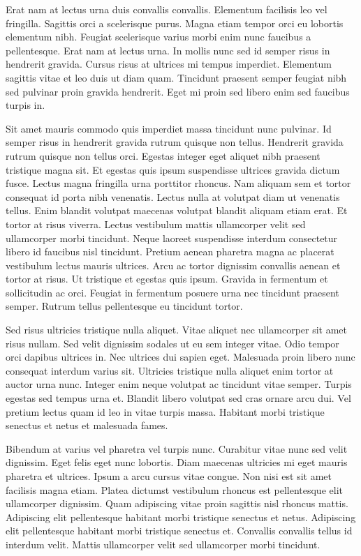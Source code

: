 \documentclass[11pt,a4paper]{article}
\begin{document}
Erat nam at lectus urna duis convallis convallis. Elementum facilisis leo vel fringilla. Sagittis orci a scelerisque purus. Magna etiam tempor orci eu lobortis elementum nibh. Feugiat scelerisque varius morbi enim nunc faucibus a pellentesque. Erat nam at lectus urna. In mollis nunc sed id semper risus in hendrerit gravida. Cursus risus at ultrices mi tempus imperdiet. Elementum sagittis vitae et leo duis ut diam quam. Tincidunt praesent semper feugiat nibh sed pulvinar proin gravida hendrerit. Eget mi proin sed libero enim sed faucibus turpis in.

Sit amet mauris commodo quis imperdiet massa tincidunt nunc pulvinar. Id semper risus in hendrerit gravida rutrum quisque non tellus. Hendrerit gravida rutrum quisque non tellus orci. Egestas integer eget aliquet nibh praesent tristique magna sit. Et egestas quis ipsum suspendisse ultrices gravida dictum fusce. Lectus magna fringilla urna porttitor rhoncus. Nam aliquam sem et tortor consequat id porta nibh venenatis. Lectus nulla at volutpat diam ut venenatis tellus. Enim blandit volutpat maecenas volutpat blandit aliquam etiam erat. Et tortor at risus viverra. Lectus vestibulum mattis ullamcorper velit sed ullamcorper morbi tincidunt. Neque laoreet suspendisse interdum consectetur libero id faucibus nisl tincidunt. Pretium aenean pharetra magna ac placerat vestibulum lectus mauris ultrices. Arcu ac tortor dignissim convallis aenean et tortor at risus. Ut tristique et egestas quis ipsum. Gravida in fermentum et sollicitudin ac orci. Feugiat in fermentum posuere urna nec tincidunt praesent semper. Rutrum tellus pellentesque eu tincidunt tortor.

Sed risus ultricies tristique nulla aliquet. Vitae aliquet nec ullamcorper sit amet risus nullam. Sed velit dignissim sodales ut eu sem integer vitae. Odio tempor orci dapibus ultrices in. Nec ultrices dui sapien eget. Malesuada proin libero nunc consequat interdum varius sit. Ultricies tristique nulla aliquet enim tortor at auctor urna nunc. Integer enim neque volutpat ac tincidunt vitae semper. Turpis egestas sed tempus urna et. Blandit libero volutpat sed cras ornare arcu dui. Vel pretium lectus quam id leo in vitae turpis massa. Habitant morbi tristique senectus et netus et malesuada fames.

Bibendum at varius vel pharetra vel turpis nunc. Curabitur vitae nunc sed velit dignissim. Eget felis eget nunc lobortis. Diam maecenas ultricies mi eget mauris pharetra et ultrices. Ipsum a arcu cursus vitae congue. Non nisi est sit amet facilisis magna etiam. Platea dictumst vestibulum rhoncus est pellentesque elit ullamcorper dignissim. Quam adipiscing vitae proin sagittis nisl rhoncus mattis. Adipiscing elit pellentesque habitant morbi tristique senectus et netus. Adipiscing elit pellentesque habitant morbi tristique senectus et. Convallis convallis tellus id interdum velit. Mattis ullamcorper velit sed ullamcorper morbi tincidunt.
\end{document}
